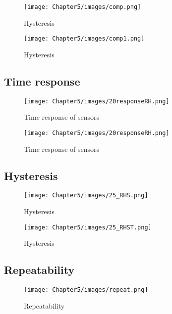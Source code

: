 \begin{figure}[!h]
\centering
\texttt{[image: Chapter5/images/comp.png]}
\caption{Hysteresis}
\label{fig_calibration}
\end{figure}


\begin{figure}[!h]
\centering
\texttt{[image: Chapter5/images/comp1.png]}
\caption{Hysteresis}
\label{fig_calibration1}
\end{figure}





\subsection{Time response}

\begin{figure}[!h]
\centering
\texttt{[image: Chapter5/images/20responseRH.png]}
\caption{Time response of sensors}
\label{fig_time_response}
\end{figure}

\begin{figure}[!h]
\centering
\texttt{[image: Chapter5/images/20responseRH.png]}
\caption{Time response of sensors}
\label{fig_time_response2}
\end{figure}


\subsection{Hysteresis}

\begin{figure}[!h]
\centering
\texttt{[image: Chapter5/images/25\_RHS.png]}
\caption{Hysteresis}
\label{fig_hysteresis}
\end{figure}

\begin{figure}[!h]
\centering
\texttt{[image: Chapter5/images/25\_RHST.png]}
\caption{Hysteresis}
\label{fig_hysteresis2}
\end{figure}



\subsection{Repeatability}


\begin{figure}[!h]
\centering
\texttt{[image: Chapter5/images/repeat.png]}
\caption{Repeatability}
\label{fig_repeatability}
\end{figure}



